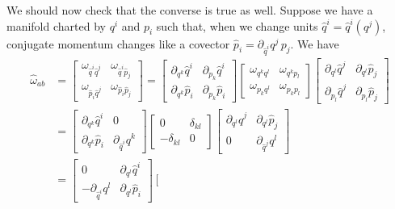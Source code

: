 We should now check that the converse is true as well. Suppose we have a manifold charted by $q^i$ and $p_i$ such that, when we change units $\hat{q}^i = \hat{q}^i(q^j)$, conjugate momentum changes like a covector $\hat{p}_i = \partial_{\hat{q}^i} q^j \, p_j$. We have
\begin{equation}
	\begin{aligned}
		\hat{\omega}_{ab} &=\left[\begin{array}{cc}
			\omega_{\hat{q}^i \hat{q}^j} & \omega_{\hat{q}^i \hat{p}_j} \\
			\omega_{\hat{p}_i \hat{q}^j} & \omega_{\hat{p}_i \hat{p}_j} 
		\end{array} \right] = \left[\begin{array}{cc}
			\partial_{q^k} \hat{q}^i & \partial_{p_k} \hat{q}^i \\
			\partial_{q^k} \hat{p}_i & \partial_{p_k} \hat{p}_i 
		\end{array} \right]
		\left[\begin{array}{cc}
			\omega_{q^k q^l} & \omega_{q^k p_l} \\
			\omega_{p_k q^l} & \omega_{p_k p_l} 
		\end{array} \right]
		\left[\begin{array}{cc}
			\partial_{q^l} \hat{q}^j & \partial_{q^l} \hat{p}_j \\
			\partial_{p_l} \hat{q}^j & \partial_{p_l} \hat{p}_j 
		\end{array} \right]\\
		&= \left[\begin{array}{cc}
			\partial_{q^k} \hat{q}^i & 0 \\
			\partial_{q^k} \hat{p}_i & \partial_{\hat{q}^i} q^k 
		\end{array} \right]
		\left[\begin{array}{cc}
			0 & \delta_{kl} \\
			- \delta_{kl} & 0 
		\end{array} \right]
		\left[\begin{array}{cc}
			\partial_{q^l} \hat{q}^j & \partial_{q^l} \hat{p}_j \\
			0 & \partial_{\hat{q}^j} q^l 
		\end{array} \right] \\
		&= \left[\begin{array}{cc}
			0 & \partial_{q^l} \hat{q}^i \\
			- \partial_{\hat{q}^i} q^l  & \partial_{q^l} \hat{p}_i 
		\end{array} \right]
		\left[\begin{array}{cc}

\end{array}
\end{aligned}
\end{equation}
